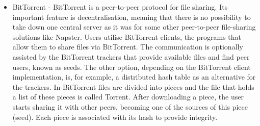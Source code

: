 \begin{itemize}
    \item BitTorrent - BitTorrent is a peer-to-peer protocol for file sharing. Its important feature is decentralisation, meaning that there is no possibility to take down one central server as it was for some other peer-to-peer file-sharing solutions like Napster. Users utilise BitTorrent clients, the programs that allow them to share files via BitTorrent. The communication is optionally assisted by the BitTorrent trackers that provide available files and find peer users, known as seeds. The other option, depending on the BitTorrent client implementation, is, for example, a distributed hash table as an alternative for the trackers. In BitTorrent files are divided into pieces and the file that holds a list of these pieces is called Torrent. After downloading a piece, the user starts sharing it with other peers, becoming one of the sources of this piece (seed). Each piece is associated with its hash to provide integrity.
\end{itemize}

